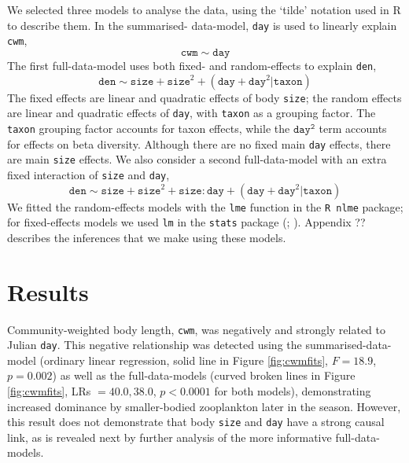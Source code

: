 \documentclass[12pt]{ecology}
\begin{document}
We selected three models to analyse the data, using the \citet{WilkinsonAndRogers1973} `tilde' notation used in R to describe them.  In the summarised- data-model, \texttt{day} is used to linearly explain \texttt{cwm},
\begin{equation}
\mathtt{cwm} \sim \mathtt{day}
\label{eq:sdm}
\end{equation}
The first full-data-model uses both fixed- and random-effects to explain \texttt{den},
\begin{equation}
\mathtt{den} \sim \mathtt{size} + \mathtt{size}^2 + (\mathtt{day} + \mathtt{day}^2 | \mathtt{taxon})
\label{eq:fdmnointeraction}
\end{equation}
The fixed effects are linear and quadratic effects of body \texttt{size}; the random effects are linear and quadratic effects of \texttt{day}, with \texttt{taxon} as a grouping factor.  The \texttt{taxon} grouping factor accounts for taxon effects, while the $\mathtt{day^2}$ term accounts for effects on beta diversity.  Although there are no fixed main \texttt{day} effects, there are main \texttt{size} effects.  We also consider a second full-data-model with an extra fixed interaction of \texttt{size} and \texttt{day},
\begin{equation}
\mathtt{den} \sim \mathtt{size} + \mathtt{size}^2 + \mathtt{size:day} + (\mathtt{day} + \mathtt{day}^2 | \mathtt{taxon})
\label{eq:fdminteraction}
\end{equation}
We fitted the random-effects models with the \texttt{lme} function in the \texttt{R nlme} package; for fixed-effects models we used \texttt{lm} in the \texttt{stats} package (; ).  Appendix ?? describes the inferences that we make using these models.

\section{Results}

Community-weighted body length, \texttt{cwm}, was negatively and strongly related to Julian \texttt{day}.  This negative relationship was detected using the summarised-data-model (ordinary linear regression, solid line in Figure \ref{fig:cwmfits}, $F = 18.9$, $p = 0.002$) as well as the full-data-models (curved broken lines in Figure \ref{fig:cwmfits}, LRs $= 40.0, 38.0$, $p < 0.0001$ for both models), demonstrating increased dominance by smaller-bodied zooplankton later in the season.  However, this result does not demonstrate that body \texttt{size} and \texttt{day} have a strong causal link, as is revealed next by further analysis of the more informative full-data-models.
\end{document}
